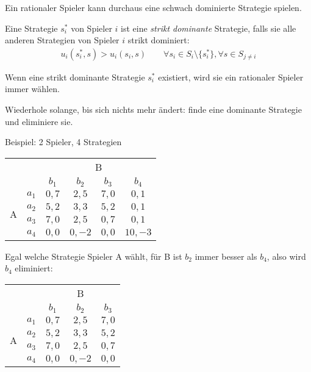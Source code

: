 Ein rationaler Spieler kann durchaus eine schwach dominierte Strategie spielen.

\begin{definition}
  Eine Strategie $s^*_i$ von Spieler $i$ ist eine \emph{strikt dominante} Strategie, falls
  sie alle anderen Strategien von Spieler $i$ strikt dominiert:
  \begin{align*}
    u_i(s^*_i, s) > u_i(s_i, s) \qquad
    \forall s_i \in S_i \setminus \{s^*_i\},
    \forall s \in S_{j \neq i}
  \end{align*}
\end{definition}

Wenn eine strikt dominante Strategie $s^*_i$ existiert, wird sie ein rationaler Spieler
immer wählen.

\begin{definition}
  Wiederhole solange, bis sich nichts mehr ändert: finde eine dominante Strategie und
  eliminiere sie.
\end{definition}

Beispiel: 2 Spieler, 4 Strategien

\begin{center}
  \begin{tabular}{cccccc}
    & & \multicolumn{4}{c}{B}\\
    & & $b_1$ & $b_2$ & $b_3$ & $b_4$\\
    \multirow{4}{*}{A} & $a_1$ & $0,7$ & $2,5$ & $7,0$ & $0,1$\\
    & $a_2$ & $5,2$ & $3,3$ & $5,2$ & $0,1$\\
    & $a_3$ & $7,0$ & $2,5$ & $0,7$ & $0,1$\\
    & $a_4$ & $0,0$ & $0,-2$ & $0,0$ & $10,-3$\\
  \end{tabular}
\end{center}

Egal welche Strategie Spieler A wählt, für B ist $b_2$ immer besser als $b_4$, also wird
$b_4$ eliminiert:

\begin{center}
  \begin{tabular}{ccccc}
    & & \multicolumn{3}{c}{B}\\
    & & $b_1$ & $b_2$ & $b_3$\\
    \multirow{4}{*}{A} & $a_1$ & $0,7$ & $2,5$ & $7,0$\\
    & $a_2$ & $5,2$ & $3,3$ & $5,2$\\
    & $a_3$ & $7,0$ & $2,5$ & $0,7$\\
    & $a_4$ & $0,0$ & $0,-2$ & $0,0$\\
  \end{tabular}
\end{center}


